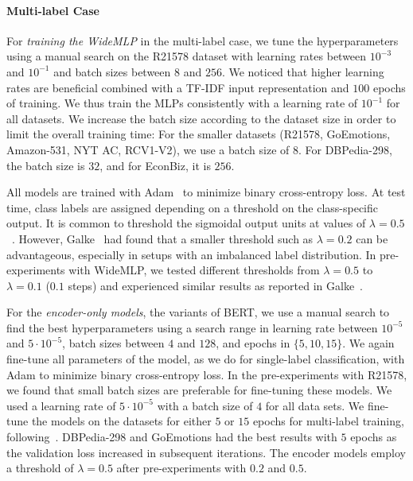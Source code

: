 \documentclass[lettersize,journal]{IEEEtran}
\newcommand{\mlp}{WideMLP\xspace}
\begin{document}
\paragraph{Multi-label Case}
For \textit{training the \mlp{}} in the multi-label case, we tune the hyperparameters using a manual search on the R21578 dataset with learning rates between $10^{-3}$ and $10^{-1}$ and batch sizes between $8$ and $256$.
We noticed that higher learning rates are beneficial combined with a TF-IDF input representation and $100$ epochs of training. We thus train the MLPs consistently with a learning rate of $10^{-1}$ for all datasets.  We increase the batch size according to the dataset size in order to limit the overall training time: For the smaller datasets (R21578, GoEmotions, Amazon-531, NYT AC, RCV1-V2), we use a batch size of 8. 
For DBPedia-298, the batch size is $32$, and for EconBiz, it is $256$.

All models are trained with Adam~\cite{DBLP:journals/corr/KingmaB14} to minimize binary cross-entropy loss. 
At test time, class labels are assigned depending on a threshold on the class-specific output.
It is common to threshold the sigmoidal output units at values of $\lambda = 0.5$~\cite{zhang,Tsoumakas}. 
However, Galke~\etal\cite{DBLP:conf/kcap/GalkeMSBS17} had found that a smaller threshold such as $\lambda=0.2$ can be advantageous, especially in setups with an imbalanced label distribution.
In pre-experiments with \mlp, we tested different thresholds from $\lambda=0.5$ to $\lambda=0.1$ ($0.1$ steps) and experienced similar results as reported in Galke~\etal\cite{DBLP:conf/kcap/GalkeMSBS17}.

For the \emph{encoder-only models}, \ie the variants of BERT, we use a manual search to find the best hyperparameters using a search range in learning rate between $10^{-5}$ and $5 \cdot 10^{-5}$, batch sizes between $4$ and $128$, and epochs in $\{5,10,15\}$. 
We again fine-tune all parameters of the model, as we do for single-label classification, with Adam to
minimize binary cross-entropy loss. 
In the pre-experiments with R21578, we found that small batch sizes are preferable for fine-tuning these models.
We used a learning rate of $5 \cdot 10^{-5}$ 
with a batch size of $4$ for all data sets.
We fine-tune the models on the datasets for either $5$ or $15$ epochs for multi-label training, following~\cite{galkescherp-acl2022}.
DBPedia-298 and GoEmotions had the best results with $5$ epochs as the validation loss increased in subsequent iterations.
The encoder models employ a threshold of $\lambda=0.5$ after pre-experiments with $0.2$ and $0.5$. 
\end{document}
